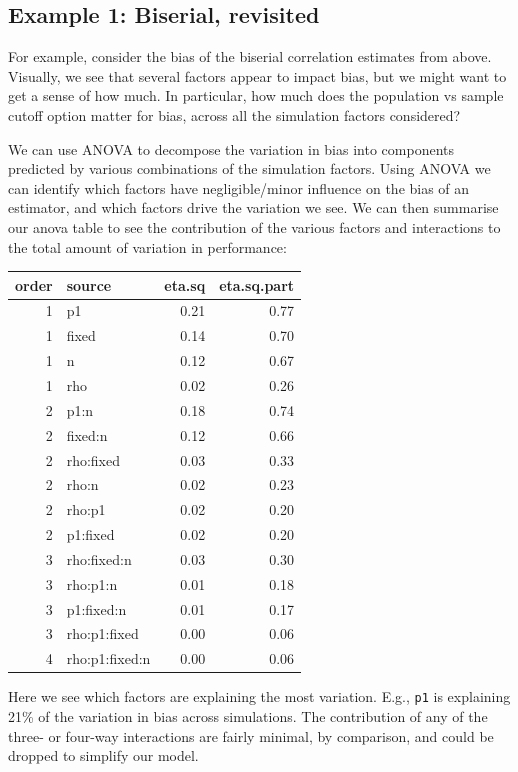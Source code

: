 \documentclass[
]{book}
\begin{document}
\subsection{Example 1: Biserial, revisited}\label{example-1-biserial-revisited}

For example, consider the bias of the biserial correlation estimates from above.
Visually, we see that several factors appear to impact bias, but we might want to get a sense of how much.
In particular, how much does the population vs sample cutoff option matter for bias, across all the simulation factors considered?

We can use ANOVA to decompose the variation in bias into components predicted by various combinations of the simulation factors.
Using ANOVA we can identify which factors have negligible/minor influence on the bias of an estimator, and which factors drive the variation we see.
We can then summarise our anova table to see the contribution of the various factors and interactions to the total amount of variation in performance:

\begin{tabular}{r|l|r|r}
\hline
order & source & eta.sq & eta.sq.part\\
\hline
1 & p1 & 0.21 & 0.77\\
\hline
1 & fixed & 0.14 & 0.70\\
\hline
1 & n & 0.12 & 0.67\\
\hline
1 & rho & 0.02 & 0.26\\
\hline
2 & p1:n & 0.18 & 0.74\\
\hline
2 & fixed:n & 0.12 & 0.66\\
\hline
2 & rho:fixed & 0.03 & 0.33\\
\hline
2 & rho:n & 0.02 & 0.23\\
\hline
2 & rho:p1 & 0.02 & 0.20\\
\hline
2 & p1:fixed & 0.02 & 0.20\\
\hline
3 & rho:fixed:n & 0.03 & 0.30\\
\hline
3 & rho:p1:n & 0.01 & 0.18\\
\hline
3 & p1:fixed:n & 0.01 & 0.17\\
\hline
3 & rho:p1:fixed & 0.00 & 0.06\\
\hline
4 & rho:p1:fixed:n & 0.00 & 0.06\\
\hline
\end{tabular}

Here we see which factors are explaining the most variation. E.g., \texttt{p1} is explaining 21\% of the variation in bias across simulations.
The contribution of any of the three- or four-way interactions are fairly minimal, by comparison, and could be dropped to simplify our model.
\end{document}
